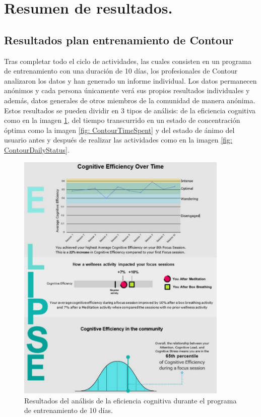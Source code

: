 
\section{Resumen de resultados.}

\subsection{Resultados plan entrenamiento de Contour}

Tras completar todo el ciclo de actividades, las cuales consisten en un programa de entrenamiento con una duración de 10 días, los profesionales de Contour analizaron los datos y han generado un informe individual. Los datos permanecen anónimos y cada persona únicamente verá sus propios resultados individuales y además, datos generales de otros miembros de la comunidad de manera anónima. Estos resultados se pueden dividir en 3 tipos de análisis: de la eficiencia cognitiva como en la imagen \ref{fig: ContourCognitiveEfficiency}, del tiempo transcurrido en un estado de concentración óptima como la imagen \ref{fig: ContourTimeSpent} y del estado de ánimo del usuario antes y después de realizar las actividades como en la imagen \ref{fig: ContourDailyStatus}.

\newpage
\begin{figure}[h]
    \centering
    \includegraphics[width=0.9\textwidth]{img/ContourCognitiveEfficiency.pdf}
    \caption{Resultados del análisis de la eficiencia cognitiva durante el programa de entrenamiento de 10 días.}
    \label{fig: ContourCognitiveEfficiency}
    \end{figure}

